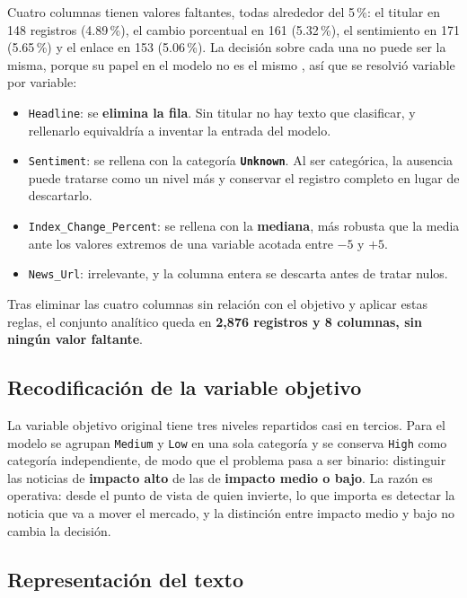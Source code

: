 \documentclass[11pt, a4paper]{article}
\begin{document}
Cuatro columnas tienen valores faltantes, todas alrededor del 5\,\%: el titular en 148 registros
(4.89\,\%), el cambio porcentual en 161 (5.32\,\%), el sentimiento en 171 (5.65\,\%) y el enlace en
153 (5.06\,\%). La decisión sobre cada una no puede ser la misma, porque su papel en el modelo no
es el mismo \cite{rubin1976}, así que se resolvió variable por variable:

\begin{itemize}
    \item \texttt{Headline}: se \textbf{elimina la fila}. Sin titular no hay texto que clasificar,
        y rellenarlo equivaldría a inventar la entrada del modelo.
    \item \texttt{Sentiment}: se rellena con la categoría \textbf{\texttt{Unknown}}. Al ser
        categórica, la ausencia puede tratarse como un nivel más y conservar el registro completo
        en lugar de descartarlo.
    \item \texttt{Index\_Change\_Percent}: se rellena con la \textbf{mediana}, más robusta que la
        media ante los valores extremos de una variable acotada entre $-5$ y $+5$.
    \item \texttt{News\_Url}: irrelevante, y la columna entera se descarta antes de tratar nulos.
\end{itemize}

Tras eliminar las cuatro columnas sin relación con el objetivo y aplicar estas reglas, el conjunto
analítico queda en \textbf{2{,}876 registros y 8 columnas, sin ningún valor faltante}.

\subsection{Recodificación de la variable objetivo}

La variable objetivo original tiene tres niveles repartidos casi en tercios. Para el modelo se
agrupan \texttt{Medium} y \texttt{Low} en una sola categoría y se conserva \texttt{High} como
categoría independiente, de modo que el problema pasa a ser binario: distinguir las noticias de
\textbf{impacto alto} de las de \textbf{impacto medio o bajo}. La razón es operativa: desde el
punto de vista de quien invierte, lo que importa es detectar la noticia que va a mover el mercado,
y la distinción entre impacto medio y bajo no cambia la decisión.

\subsection{Representación del texto}
\end{document}
